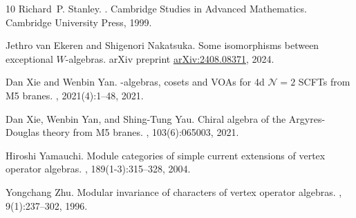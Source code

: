 \documentclass[12pt]{amsart}
\theoremstyle{plain}
\theoremstyle{definition}
\numberwithin{equation}{section}
\begin{document}
\begin{thebibliography}{10}
Richard~P. Stanley.
.
\newblock Cambridge Studies in Advanced Mathematics. Cambridge University
  Press, 1999.

Jethro van Ekeren and Shigenori Nakatsuka.
\newblock Some isomorphisms between exceptional {$W$}-algebras.
\newblock arXiv preprint \url{arXiv:2408.08371}, 2024.

Dan Xie and Wenbin Yan.
-algebras, cosets and {VOA}s for 4d {$\mathcal{N}=2$} {SCFT}s
  from {M5} branes.
, 2021(4):1--48, 2021.

Dan Xie, Wenbin Yan, and Shing-Tung Yau.
\newblock Chiral algebra of the {A}rgyres-{D}ouglas theory from {M5} branes.
, 103(6):065003, 2021.

Hiroshi Yamauchi.
\newblock Module categories of simple current extensions of vertex operator
  algebras.
, 189(1-3):315--328, 2004.

Yongchang Zhu.
\newblock Modular invariance of characters of vertex operator algebras.
, 9(1):237--302,
  1996.

\end{thebibliography}
\end{document}
